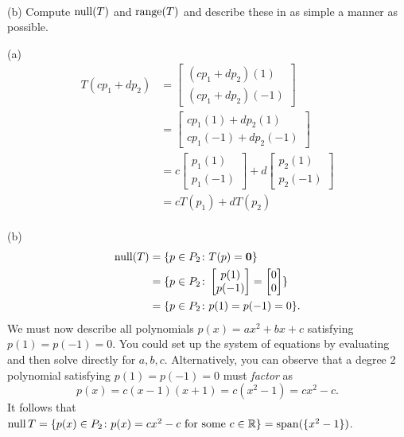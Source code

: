 \\
(b) Compute  $\operatorname{null}(T)$ and $\operatorname{range}(T)$ and describe these in as simple a manner as possible. 
\\
\begin{solution} \noindent
(a) 
\begin{align*}
T(cp_1+dp_2)&=\begin{bmatrix} (cp_1+dp_2)(1)\\ (cp_1+dp_2)(-1)\end{bmatrix}\\
&=\begin{bmatrix} cp_1(1)+dp_2(1)\\ cp_1(-1)+dp_2(-1)\end{bmatrix}\\
&=c\begin{bmatrix} p_1(1)\\ p_1(-1)\end{bmatrix}+
d\begin{bmatrix}p_2(1)\\ p_2(-1)\end{bmatrix}\\
&=cT(p_1)+dT(p_2)
\end{align*}
\\
(b) 
\begin{align*}
\operatorname{null}(T)&=\{p\in P_2\colon T(p)={\mathbf 0}\}\\
&=\{p\in P_2\colon \begin{bmatrix}
p(1)\\ p(-1)
\end{bmatrix}=\begin{bmatrix}
0\\ 0
\end{bmatrix}\}\\
&=\{p\in P_2\colon p(1)=p(-1)=0\}.
\end{align*}
We must now describe all polynomials $p(x)=ax^2+bx+c$ satisfying $p(1)=p(-1)=0$. You could set up the system of equations by evaluating and then solve directly for $a, b, c$. Alternatively, you can observe that a degree 2 polynomial satisfying $p(1)=p(-1)=0$ must {\em factor} as 
\[
p(x)=c(x-1)(x+1)=c(x^2-1)=cx^2-c.\] It follows that $\operatorname{null} T=\{p(x)\in P_2\colon p(x)=cx^2-c \text{ for some } c\in{\mathbb R}\}=\operatorname{span}(\{x^2-1\})$. 


\end{solution}
